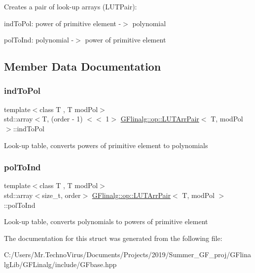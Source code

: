 Creates a pair of look-\/up arrays (L\+U\+T\+Pair)\+:
\begin{DoxyItemize}
\item ind\+To\+Pol\+: power of primitive element -\/$>$ polynomial
\item pol\+To\+Ind\+: polynomial -\/$>$ power of primitive element 
\end{DoxyItemize}

\subsection{Member Data Documentation}
\mbox{\label{struct_g_flinalg_1_1op_1_1_l_u_t_arr_pair_a02a58d258f3ddfea418c6ce342bc0dc0}} 
\subsubsection{\texorpdfstring{indToPol}{indToPol}}
{\footnotesize\ttfamily template$<$class T , T mod\+Pol$>$ \\
std\+::array$<$T, (order -\/ 1) $<$$<$ 1$>$ \mbox{\hyperlink{struct_g_flinalg_1_1op_1_1_l_u_t_arr_pair}{G\+Flinalg\+::op\+::\+L\+U\+T\+Arr\+Pair}}$<$ T, mod\+Pol $>$\+::ind\+To\+Pol}

Look-\/up table, converts powers of primitive element to polynomials \mbox{\label{struct_g_flinalg_1_1op_1_1_l_u_t_arr_pair_a4239b75efb0f73c38a44d16246ee980d}} 
\subsubsection{\texorpdfstring{polToInd}{polToInd}}
{\footnotesize\ttfamily template$<$class T , T mod\+Pol$>$ \\
std\+::array$<$size\+\_\+t, order$>$ \mbox{\hyperlink{struct_g_flinalg_1_1op_1_1_l_u_t_arr_pair}{G\+Flinalg\+::op\+::\+L\+U\+T\+Arr\+Pair}}$<$ T, mod\+Pol $>$\+::pol\+To\+Ind}

Look-\/up table, converts polynomials to powers of primitive element 

The documentation for this struct was generated from the following file\+:\begin{DoxyCompactItemize}
\item 
C\+:/\+Users/\+Mr.\+Techno\+Virus/\+Documents/\+Projects/2019/\+Summer\+\_\+\+G\+F\+\_\+proj/\+G\+Flinalg\+Lib/\+G\+F\+Linalg/include/G\+Fbase.\+hpp\end{DoxyCompactItemize}
